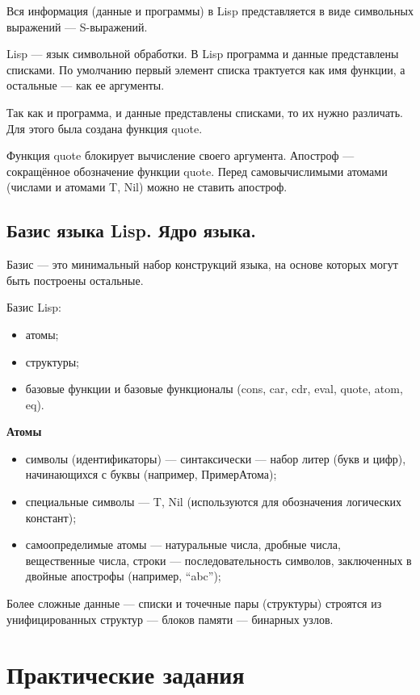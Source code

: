 \documentclass[12pt]{report}
\begin{document}
Вся информация (данные и программы) в Lisp представляется в виде символьных выражений --- S-выражений.  

Lisp --- язык символьной обработки. В Lisp программа и данные представлены списками. По умолчанию первый элемент списка трактуется как имя функции, а остальные --- как ее аргументы.

Так как и программа, и данные представлены списками, то их нужно различать. Для этого была создана функция quote.

Функция quote блокирует вычисление своего аргумента. Апостроф --- сокращённое обозначение функции quote. Перед самовычислимыми атомами (числами и атомами T, Nil) можно не ставить апостроф.


\section{Базис языка Lisp. Ядро языка.}
Базис --- это минимальный набор конструкций языка, на основе которых могут быть построены остальные.

Базис Lisp:

\begin{itemize}
	\item атомы;
        \item структуры;
	\item базовые функции и базовые функционалы (cons, car, cdr, eval, quote, atom, eq).

\end{itemize}

\textbf{Атомы}
\begin{itemize}
    \item символы (идентификаторы) --- синтаксически --- набор литер (букв и цифр), начинающихся с буквы (например, ПримерАтома);
    \item специальные символы --- {T, Nil} (используются для обозначения логических констант);
    \item самоопределимые атомы --- натуральные числа, дробные числа, вещественные числа, строки --- последовательность символов, заключенных в двойные апострофы (например, “abc”);
\end{itemize} 

Более сложные данные --- списки и точечные пары (структуры) строятся из унифицированных структур --- блоков памяти --- бинарных узлов.

	
\chapter{Практические задания}	
\end{document}
